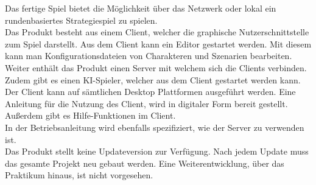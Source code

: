 Das fertige Spiel bietet die Möglichkeit über das Netzwerk oder lokal ein rundenbasiertes
Strategiespiel zu spielen.\\
Das Produkt besteht aus einem Client, welcher die graphische Nutzerschnittstelle zum Spiel
darstellt. Aus dem Client kann ein Editor gestartet werden. Mit diesem kann man Konfigurationsdateien von Charakteren und
Szenarien bearbeiten. Weiter enthält das Produkt einen Server mit welchem sich die Clients verbinden.\\
Zudem gibt es einen KI-Spieler, welcher aus dem Client gestartet werden kann.\\
Der Client kann auf sämtlichen Desktop Plattformen ausgeführt werden. Eine Anleitung für die Nutzung des Client, wird in digitaler Form bereit gestellt. 
Außerdem gibt es Hilfe-Funktionen im Client.\\
In der Betriebsanleitung wird ebenfalls spezifiziert, wie der Server zu verwenden ist.\\

Das Produkt stellt keine Updateversion zur Verfügung. Nach jedem Update muss das gesamte Projekt
neu gebaut werden. Eine Weiterentwicklung, über das Praktikum hinaus, ist nicht vorgesehen.
